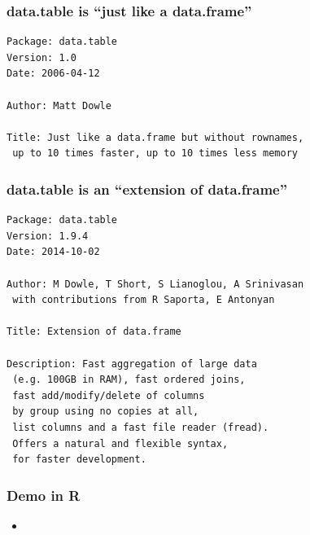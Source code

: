 \documentclass{beamer}
\begin{document}
\begin{frame}[fragile]
  \frametitle{data.table is ``just like a data.frame''}

\begin{verbatim}
Package: data.table
Version: 1.0
Date: 2006-04-12

Author: Matt Dowle

Title: Just like a data.frame but without rownames, 
 up to 10 times faster, up to 10 times less memory

\end{verbatim}



\end{frame}

\begin{frame}[fragile]
  \frametitle{data.table is an ``extension of data.frame''}

\begin{verbatim}
Package: data.table
Version: 1.9.4
Date: 2014-10-02

Author: M Dowle, T Short, S Lianoglou, A Srinivasan 
 with contributions from R Saporta, E Antonyan

Title: Extension of data.frame

Description: Fast aggregation of large data
 (e.g. 100GB in RAM), fast ordered joins, 
 fast add/modify/delete of columns 
 by group using no copies at all, 
 list columns and a fast file reader (fread). 
 Offers a natural and flexible syntax, 
 for faster development.
\end{verbatim}

\end{frame}

\begin{frame}
  \frametitle{Demo in R}
  
  \begin{itemize}
  \item {}
  \end{itemize}
\end{frame}
\end{document}
